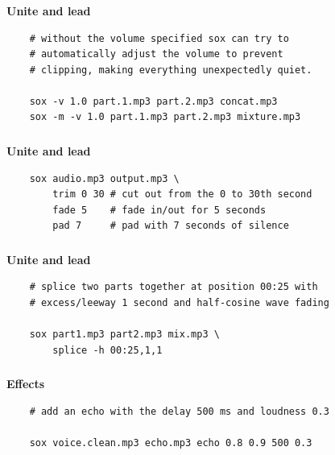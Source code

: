 \documentclass[usenames,dvipsnames, 18pt, compress, aspectratio=169]{beamer}
\begin{document}
\begin{frame}[fragile]{}
    \frametitle{}
    \begin{center}
        \textbf{Unite and lead}
        \vspace{0.2cm}

        \begin{verbatim}
    # without the volume specified sox can try to
    # automatically adjust the volume to prevent
    # clipping, making everything unexpectedly quiet.

    sox -v 1.0 part.1.mp3 part.2.mp3 concat.mp3
    sox -m -v 1.0 part.1.mp3 part.2.mp3 mixture.mp3
        \end{verbatim}
    \end{center}
\end{frame}

\begin{frame}[fragile]{}
    \frametitle{}
    \begin{center}
        \textbf{Unite and lead}
        \vspace{0.2cm}

        \begin{verbatim}
    sox audio.mp3 output.mp3 \
        trim 0 30 # cut out from the 0 to 30th second
        fade 5    # fade in/out for 5 seconds
        pad 7     # pad with 7 seconds of silence
        \end{verbatim}
    \end{center}
\end{frame}

\begin{frame}[fragile]{}
    \frametitle{}
    \begin{center}
        \textbf{Unite and lead}
        \vspace{0.2cm}

        \begin{verbatim}
    # splice two parts together at position 00:25 with
    # excess/leeway 1 second and half-cosine wave fading

    sox part1.mp3 part2.mp3 mix.mp3 \
        splice -h 00:25,1,1
        \end{verbatim}
    \end{center}
\end{frame}

\begin{frame}[fragile]{}
    \frametitle{}
    \begin{center}
        \textbf{Effects}
        \vspace{0.2cm}

        \begin{verbatim}
    # add an echo with the delay 500 ms and loudness 0.3

    sox voice.clean.mp3 echo.mp3 echo 0.8 0.9 500 0.3
        \end{verbatim}
    \end{center}
\end{frame}
\end{document}
